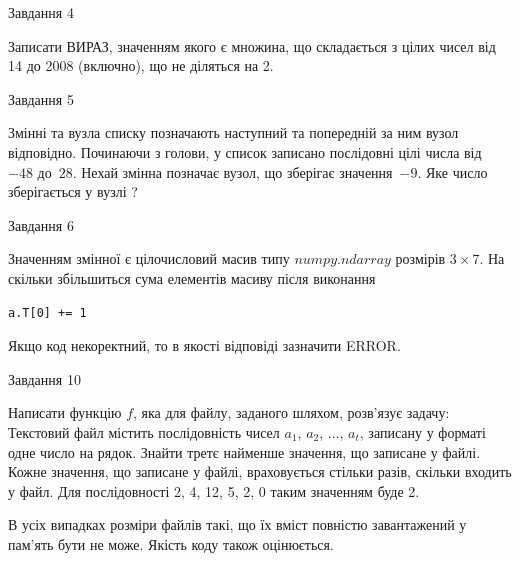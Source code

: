 \documentclass[12pt, ukrainian]{article}
\begin{document}
{\begin{minipage}[t]{8.0cm}
\end{minipage}


               
{\begin{center}Завдання {4}\end{center}}
\vspace{-4mm}
Записати ВИРАЗ, значенням якого є множина, що складається з цілих чисел від 14 до 2008 (включно), що не діляться на 2.\par

\vspace{10mm}
               
{\begin{center}Завдання {5}\end{center}}
\vspace{-4mm}
Змінні  та  вузла списку позначають наступний та попередній за ним вузол відповідно. Починаючи з голови, у список записано послідовні цілі числа від~$-48$ до~$28$. Нехай змінна  позначає вузол, що зберігає значення~$-9$.
Яке число зберігається у вузлі  ?\par

               
{\begin{center}Завдання {6}\end{center}}
\vspace{-4mm}
Значенням змінної  є цілочисловий масив типу $numpy.ndarray$ розмірів $3{\times}7$. На скільки збільшиться сума елементів масиву  після виконання
\begin{verbatim}
a.T[0] += 1
\end{verbatim}


Якщо код некоректний, то в якості відповіді зазначити ERROR.\par

               
{\begin{center}Завдання {10}\end{center}}
\vspace{-4mm}

Написати функцію $f$, яка для файлу, заданого шляхом, розв’язує задачу:\\ Текстовий файл містить послідовність чисел $a_1$, $a_2$, $\ldots$, $a_t$, записану у форматі одне число на рядок. Знайти третє найменше значення, що записане у файлі. Кожне значення, що записане у файлі, враховується стільки разів, скільки входить у файл. Для послідовності 2, 4, 12, 5, 2, 0 таким значенням буде 2.

В усіх випадках розміри файлів такі, що їх вміст повністю завантажений у пам'ять бути не може. Якість коду також оцінюється.



}
\end{document}
